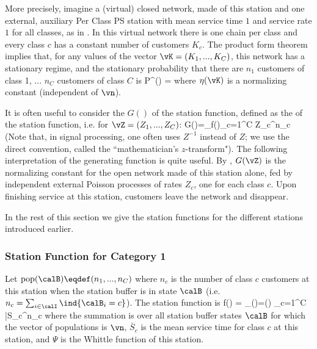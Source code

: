 More precisely, imagine a (virtual) closed
network, made of this station and one external,
auxiliary Per Class PS station with mean service
time $1$ and service rate $1$ for all classes, as
in . In this virtual network
there is one chain per class and every class $c$
has a constant number of customers $K_c$. The
product form theorem implies that, for any values
of the vector $\vK=(K_1,...,K_C)$, this network
has a stationary regime, and the stationary
probability that there are $n_1$ customers of
class 1, ... $n_C$ customers of class $C$ is
  \be
  P^{}(\vn) = 
  \label{eq-q-def-stat-fun}
  \ee
where $\eta(\vK)$ is a normalizing constant
(independent of $\vn$).

It is often useful to consider the 
$G()$ of the station function, defined as the   of the station function, i.e.
for $\vZ=(Z_1,...,Z_C)$:
 \be
 G(\vZ)=\sum_{\vn {}}f(\vn)\prod_{c=1}^C Z_c^{n_c}
 \label{eq-q-def-stat-fun-2}
 \ee
(Note that, in signal processing, one often uses $Z^{-1}$
instead of $Z$; we use the direct convention, called the
``mathematician's $z$-transform"). The following interpretation
of the generating function is quite useful. By
, $G(\vZ)$ is the normalizing constant
for the open network made of this station alone, fed by
independent external Poisson processes of rates $Z_c$, one for
each class $c$. Upon finishing service at this station,
customers leave the network and disappear.



In the rest of this section we give the station
functions for the different stations introduced
earlier.

\subsubsection{Station Function for Category 1}

Let $\mathrm{pop}(\calB)\eqdef (n_1, ...,
 n_C)$ where $n_c$ is the number of class $c$ customers at this
 station when the station buffer is in state
 $\calB$ (i.e. $n_c=\sum_{i \in \calI} \ind{\calB_i=c}$).
 The station function is
 \be
  f(\vn) =
  \sum_{(\calB)=\vn}\Psi(\calB)
  \prod_{c=1}^C \bar{S}_c^{n_c}
 \ee where the summation is over all station
 buffer states $\calB$ for which the vector
of populations is $\vn$, $\bar{S}_c$ is the mean
service time for class $c$ at this station, and
$\Psi$ is the Whittle function of this station.

